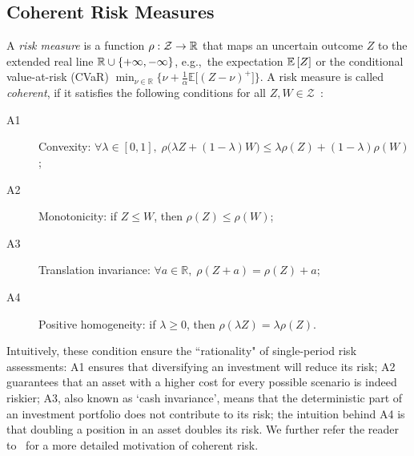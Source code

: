 \documentclass{article} %
\newcommand{\citet}{\cite}
\begin{document}
\subsection{Coherent Risk Measures}
\label{subsec:coherent}
\vspace{-0.1in}
A \emph{risk measure} is a function $\rho:\mathcal Z \to \mathbb R$ that maps an uncertain outcome $Z$ to the extended real line ${\mathbb{R}} \cup\{ +\infty,-\infty\}$, e.g.,~the expectation $\mathbb{E}\left[ Z \right]$ or the conditional value-at-risk (CVaR) $\min_{\nu\in\mathbb R}\big\{\nu + \frac{1}{\alpha}\mathbb E\big[(Z-\nu)^+\big]\big\}$.
A risk measure is called \emph{coherent}, if it satisfies the following conditions for all $Z,W\in\mathcal Z$~\cite{artzner1999coherent}:
%
\begin{description}
\item[A1] Convexity: $\forall\lambda\in[0,1],\;\rho\big(\lambda Z + (1-\lambda)W\big)\leq \lambda\rho(Z) + (1-\lambda)\rho(W)$;
\item[A2] Monotonicity:  if $Z\leq W$, then $\rho(Z)\leq\rho(W)$;
\item[A3] Translation invariance: $\forall a\! \in \!\mathbb R,\;\rho(Z+a)=\rho(Z) + a$;
\item[A4] Positive homogeneity: if $\lambda\geq0$, then $\rho(\lambda Z) = \lambda \rho(Z)$.
\end{description}
%
Intuitively, these condition ensure the ``rationality" of single-period risk assessments: A1 ensures that diversifying an investment will reduce its risk; A2 guarantees that an asset with a higher cost for every possible scenario is indeed riskier; A3, also known as `cash invariance', means that the deterministic part of an investment portfolio does not contribute to its risk; the intuition behind A4 is that doubling a position in an asset doubles its risk.
We further refer the reader to~\citet{artzner1999coherent} for a more detailed motivation of coherent risk.
\end{document}
